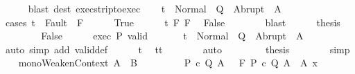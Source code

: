 \begin{isabellebody}
\ \ \ \ \isamarkupfalse%
\ {\isacharparenleft}blast\ dest{\isacharcolon}\ exec{\isacharunderscore}strip{\isacharunderscore}to{\isacharunderscore}exec{\isacharparenright}\isanewline
\ \ \isamarkupfalse%
\ {\isachardoublequoteopen}t\ {\isasymin}\ Normal\ {\isacharbackquote}\ Q\ {\isasymunion}\ Abrupt\ {\isacharbackquote}\ A{\isachardoublequoteclose}\isanewline
\ \ \isamarkupfalse%
\ {\isacharparenleft}cases\ {\isachardoublequoteopen}t{\isacharprime}\ {\isasymin}\ Fault\ {\isacharbackquote}\ F{\isachardoublequoteclose}{\isacharparenright}\isanewline
\ \ \ \ \isamarkupfalse%
\ True\isanewline
\ \ \ \ \isamarkupfalse%
\ t{\isacharprime}\ F\ F{\isacharprime}\ \isamarkupfalse%
\ False\isanewline
\ \ \ \ \ \ \isamarkupfalse%
\ blast\isanewline
\ \ \ \ \isamarkupfalse%
\ {\isacharquery}thesis\ \isacommand{{\isachardot}{\isachardot}}\isamarkupfalse%
\isanewline
\ \ \isamarkupfalse%
\isanewline
\ \ \ \ \isamarkupfalse%
\ False\isanewline
\ \ \ \ \isamarkupfalse%
\ exec\ P\ valid\isanewline
\ \ \ \ \isamarkupfalse%
\ {\isacharasterisk}{\isacharcolon}\ {\isachardoublequoteopen}t{\isacharprime}\ {\isasymin}\ Normal\ {\isacharbackquote}\ Q\ {\isasymunion}\ Abrupt\ {\isacharbackquote}\ A{\isachardoublequoteclose}\isanewline
\ \ \ \ \ \ \isamarkupfalse%
\ {\isacharparenleft}auto\ simp\ add{\isacharcolon}\ valid{\isacharunderscore}def{\isacharparenright}\isanewline
\ \ \ \ \isamarkupfalse%
\ t{\isacharprime}\ \isamarkupfalse%
\ {\isachardoublequoteopen}t{\isacharprime}{\isacharequal}t{\isachardoublequoteclose}\isanewline
\ \ \ \ \ \ \isamarkupfalse%
\ auto\isanewline
\ \ \ \ \isamarkupfalse%
\ {\isacharasterisk}\ \isamarkupfalse%
\ {\isacharquery}thesis\isanewline
\ \ \ \ \ \ \isamarkupfalse%
\ simp\isanewline
\ \ \isamarkupfalse%
\isanewline
{}\isamarkupfalse%
%
\endisatagproof
{\isafoldproof}%
%
\isadelimproof
%
\endisadelimproof
%
\isamarkuptrue%
\isamarkupfalse%
\ mono{\isacharunderscore}WeakenContext{\isacharcolon}\ {\isachardoublequoteopen}A\ {\isasymsubseteq}\ B\ {\isasymLongrightarrow}\isanewline
\ \ \ \ \ \ \ \ {\isacharparenleft}{\isasymlambda}{\isacharparenleft}P{\isacharcomma}\ c{\isacharcomma}\ Q{\isacharcomma}\ A{\isacharprime}{\isacharparenright}{\isachardot}\ {\isacharparenleft}{\isasymGamma}{\isacharcomma}\ {\isasymTheta}{\isacharcomma}\ F{\isacharcomma}\ P{\isacharcomma}\ c{\isacharcomma}\ Q{\isacharcomma}\ A{\isacharprime}{\isacharparenright}\ {\isasymin}\ A{\isacharparenright}\ x\ {\isasymlongrightarrow}\isanewline

\end{isabellebody}
